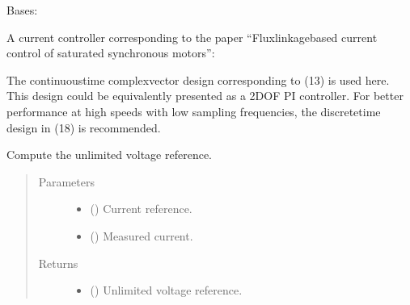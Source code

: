 \documentclass[letterpaper,10pt,english]{sphinxmanual}
\begin{document}
\begin{fulllineitems}
\label{\detokenize{control.sm:control.sm.vector.CurrentCtrl}}
\pysigstartsignatures
{}
\pysigstopsignatures
\sphinxAtStartPar
Bases: 

\sphinxAtStartPar
A current controller corresponding to the paper “Flux\sphinxhyphen{}linkage\sphinxhyphen{}based current
control of saturated synchronous motors”:
\begin{quote}

\sphinxAtStartPar
{}
\end{quote}

\sphinxAtStartPar
The continuous\sphinxhyphen{}time complex\sphinxhyphen{}vector design corresponding to (13) is used
here. This design could be equivalently presented as a 2DOF PI controller.
For better performance at high speeds with low sampling frequencies, the
discrete\sphinxhyphen{}time design in (18) is recommended.

\begin{fulllineitems}
\label{\detokenize{control.sm:control.sm.vector.CurrentCtrl.output}}
\pysigstartsignatures
{}
\pysigstopsignatures
\sphinxAtStartPar
Compute the unlimited voltage reference.
\begin{quote}\begin{description}
\item[{Parameters}] \leavevmode\begin{itemize}
\item {} 
\sphinxAtStartPar
{} () \textendash{} Current reference.

\item {} 
\sphinxAtStartPar
{} () \textendash{} Measured current.

\end{itemize}

\item[{Returns}] \leavevmode
\sphinxAtStartPar
\begin{itemize}
\item {} 
\sphinxAtStartPar
{} () \textendash{} Unlimited voltage reference.


\end{itemize}
\end{description}
\end{quote}
\end{fulllineitems}
\end{fulllineitems}
\end{document}

